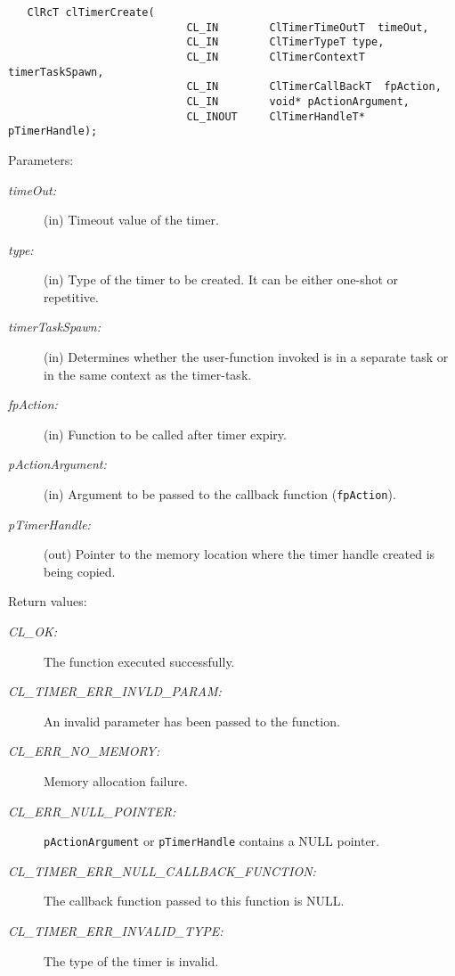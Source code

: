 \begin{flushleft}
\begin{Desc}
\footnotesize\begin{verbatim}   ClRcT clTimerCreate(
               				CL_IN        ClTimerTimeOutT  timeOut,
               				CL_IN        ClTimerTypeT type,
               				CL_IN        ClTimerContextT timerTaskSpawn,
               				CL_IN        ClTimerCallBackT  fpAction,
               				CL_IN        void* pActionArgument,
               				CL_INOUT     ClTimerHandleT*   pTimerHandle);
\end{verbatim}
\normalsize
\end{Desc}
\begin{Desc}
\item[Parameters:]
\begin{description}
\item[{\em time\-Out:}](in) Timeout value of the timer. 
\item[{\em type:}](in) Type of the timer to be created. It can be either one-shot or repetitive.
\item[{\em timer\-Task\-Spawn:}](in) Determines whether the user-function invoked is in a separate task or in the same context as the timer-task. 
\item[{\em fp\-Action:}](in) Function to be called after timer expiry. 
\item[{\em p\-Action\-Argument:}](in) Argument to be passed to the callback function ({\tt{fpAction}}).
\item[{\em p\-Timer\-Handle:}](out) Pointer to the memory location where the timer handle created is being copied.\end{description}
\end{Desc}
\begin{Desc}
\item[Return values:]
\begin{description}
\item[{\em CL\_\-OK:}]The function executed successfully. \item[{\em CL\_\-TIMER\_\-ERR\_\-INVLD\_\-PARAM:}]An invalid parameter has been passed to the function. 
\item[{\em CL\_\-ERR\_\-NO\_\-MEMORY:}]Memory allocation failure. 
\item[{\em CL\_\-ERR\_\-NULL\_\-POINTER:}]{\tt{pActionArgument}} or {\tt{pTimerHandle}} contains a NULL pointer. 
\item[{\em CL\_\-TIMER\_\-ERR\_\-NULL\_\-CALLBACK\_\-FUNCTION:}]The callback function passed to this function is NULL. 
\item[{\em CL\_\-TIMER\_\-ERR\_\-INVALID\_\-TYPE:}]The type of the timer is invalid.

\end{description}
\end{Desc}
\end{flushleft}
